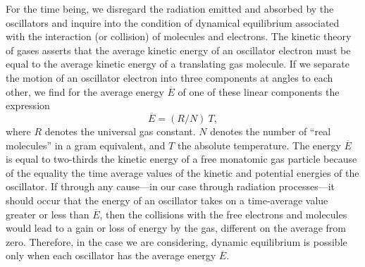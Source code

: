\documentclass[12pt]{article}
\begin{document}
For the time being, we disregard the radiation emitted and absorbed by
the    oscillators and   inquire  into  the   condition  of  dynamical
equilibrium    associated  with  the   interaction (or   collision) of
molecules and electrons. The  kinetic theory of gases asserts that the
average kinetic energy of an  oscillator electron must be equal to the
average kinetic energy  of a translating gas  molecule. If we separate
the motion of an  oscillator electron into  three components at angles
to each other, we find  for the average  energy $\overline{E}$ of one
of these linear components the expression 
$$
\overline{E} = (R/N) ~ T,
$$
where $R$ denotes the universal gas constant. $N$ denotes the number of ``real
molecules'' in a gram equivalent, and $T$ the absolute temperature. The energy
$\overline{E}$ is equal to two-thirds the kinetic energy of a free monatomic gas
particle because of the equality the time average values of the kinetic and
potential energies of the oscillator. If through any 
cause---in our case through
radiation processes---it should occur that 
the energy of an oscillator takes on a
time-average value greater or less than $\overline{E}$, then the collisions with
the free electrons and molecules would lead to a gain or loss of energy by the
gas, different on the average from zero. Therefore, in the case we are
considering, dynamic equilibrium is possible only when each oscillator has the
average energy $\overline{E}$.
\end{document}
